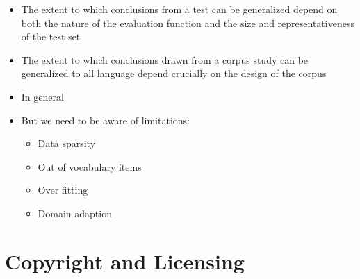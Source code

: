 \documentclass[a4paper,landscape,headrule,footrule,dvips]{foils}
\begin{document}
\begin{CJK}{UTF8}{min}
\begin{itemize}
\item The extent to which conclusions from a test can be generalized
  depend on both the nature of the evaluation function and the size
  and representativeness of the test set
\item The extent to which conclusions drawn from a corpus study can be
  generalized to all language depend crucially on the design of
  the corpus
\item In general 
\item But we need to be aware of limitations:
  \begin{itemize}
  \item Data sparsity
  \item Out of vocabulary items
  \item Over fitting
  \item Domain adaption
  \end{itemize}
\end{itemize}


\section{Copyright and Licensing}


\end{CJK}
\end{document}
